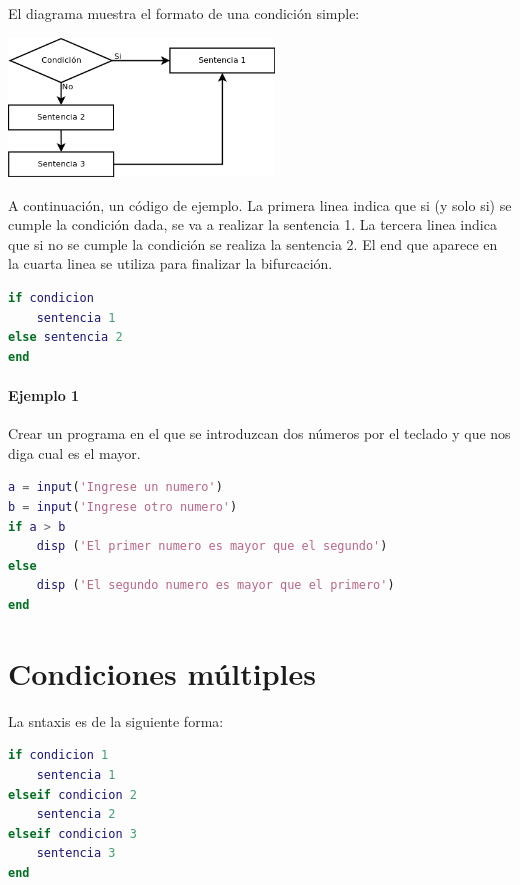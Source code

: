 El diagrama muestra el formato de una condición simple:\\

\begin{center}
\includegraphics[width=200pt]{./Imagenes/condicionsimple.png}
\end{center}

A continuación, un código de ejemplo. La primera linea indica que si (y solo si) se cumple la condición dada, se va a realizar la sentencia 1. La tercera linea indica que si no se cumple la condición se realiza la sentencia 2. El end que aparece en la cuarta linea se utiliza para finalizar la bifurcación.

\begin{lstlisting}[language=Matlab]
if condicion
    sentencia 1
else sentencia 2
end
\end{lstlisting}

\paragraph{Ejemplo 1}

Crear un programa en el que se introduzcan dos números por el teclado y que nos diga cual es el mayor.

\begin{lstlisting}[language=Matlab]
a = input('Ingrese un numero')
b = input('Ingrese otro numero')
if a > b
    disp ('El primer numero es mayor que el segundo')
else 
    disp ('El segundo numero es mayor que el primero')
end
\end{lstlisting}

\section{Condiciones múltiples}

La sntaxis es de la siguiente forma:\\
\begin{lstlisting}[language=Matlab]
if condicion 1
    sentencia 1
elseif condicion 2
    sentencia 2
elseif condicion 3
    sentencia 3
end
\end{lstlisting}

